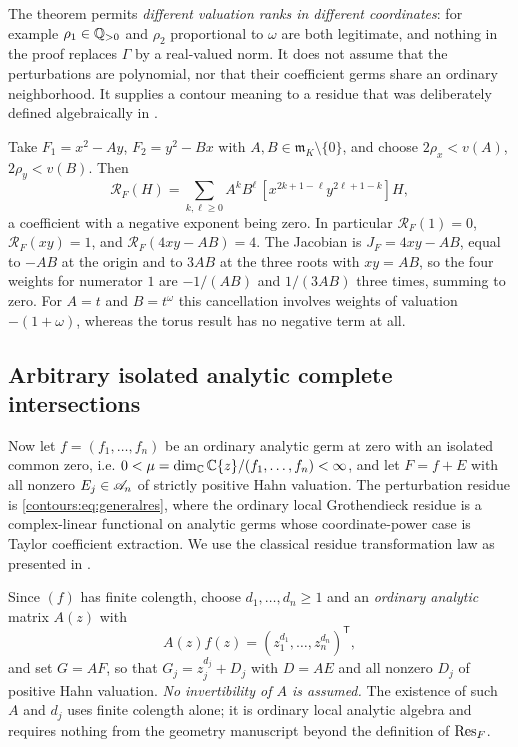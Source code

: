 \documentclass[11pt,letterpaper]{article}
\theoremstyle{definition}
\theoremstyle{remark}
\newcommand{\m}{\mathfrak m}\newcommand{\st}{\operatorname{st}}
\numberwithin{equation}{section}
\begin{document}
The theorem permits \emph{different valuation ranks in different coordinates}: for
example $\rho_1\in\mathbb Q_{>0}$ and $\rho_2$ proportional to $\omega$ are both
legitimate, and nothing in the proof replaces $\Gamma$ by a real-valued norm. It
does not assume that the perturbations are polynomial, nor that their coefficient
germs share an ordinary neighborhood. It supplies a contour meaning to a residue
that was deliberately defined algebraically in \cite{Geometry}.

\begin{example}
\label{contours:ex:coupled}
Take $F_1=x^2-Ay$, $F_2=y^2-Bx$ with $A,B\in\m_K\setminus\{0\}$, and choose
$2\rho_x<v(A)$, $2\rho_y<v(B)$. Then
\begin{equation}\label{contours:eq:coupledres}
  \mathcal R_F(H)=\sum_{k,\ell\ge0}A^kB^\ell\,
  [x^{2k+1-\ell}y^{2\ell+1-k}]H ,
\end{equation}
a coefficient with a negative exponent being zero. In particular
$\mathcal R_F(1)=0$, $\mathcal R_F(xy)=1$, and $\mathcal R_F(4xy-AB)=4$. The
Jacobian is $J_F=4xy-AB$, equal to $-AB$ at the origin and to $3AB$ at the three
roots with $xy=AB$, so the four weights for numerator $1$ are $-1/(AB)$ and
$1/(3AB)$ three times, summing to zero. For $A=t$ and $B=t^\omega$ this cancellation
involves weights of valuation $-(1+\omega)$, whereas the torus result has no
negative term at all.
\end{example}

\subsection{Arbitrary isolated analytic complete intersections}
\label{contours:subsec:general}
Now let $f=(f_1,\ldots,f_n)$ be an ordinary analytic germ at zero with an isolated
common zero, i.e. $0<\mu=\dim_\mathbb C\mathbb C\{z\}/(f_1,\ldots,f_n)<\infty$, and let $F=f+E$
with all nonzero $E_j\in\mathscr A_n$ of strictly positive Hahn valuation. The perturbation
residue is \eqref{contours:eq:generalres}, where the ordinary local Grothendieck
residue is a complex-linear functional on analytic germs whose coordinate-power case
is Taylor coefficient extraction. We use the classical residue transformation law as
presented in \cite{Tsikh,CDS}.

Since $(f)$ has finite colength, choose $d_1,\ldots,d_n\ge1$ and an \emph{ordinary
analytic} matrix $A(z)$ with
\begin{equation}\label{contours:eq:transformmatrix}
  A(z)f(z)=(z_1^{d_1},\ldots,z_n^{d_n})^{\mathsf T},
\end{equation}
and set $G=AF$, so that $G_j=z_j^{d_j}+D_j$ with $D=AE$ and all nonzero $D_j$ of
positive Hahn valuation. \emph{No invertibility of $A$ is assumed.} The existence of
such $A$ and $d_j$ uses finite colength alone; it is ordinary local analytic
algebra and requires nothing from the geometry manuscript beyond the definition of
$\operatorname{Res}_F$.
\end{document}
